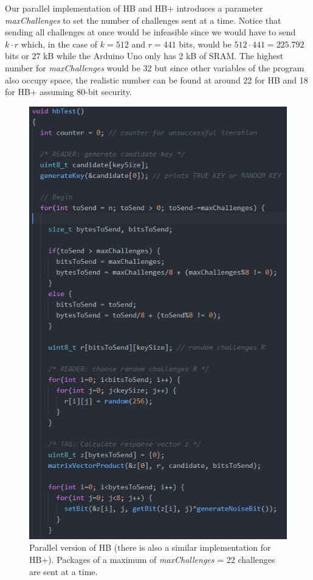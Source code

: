 \documentclass[11pt,a4paper]{article}
\begin{document}
Our parallel implementation of HB and HB+ introduces a parameter \textit{maxChallenges} to set the number of challenges sent at a time. 
Notice that sending all challenges at once would be infeasible since we would have to send $k \cdot r$ which, in the case of $ k = 512$ and $r = 441$ bits, would be $512 \cdot 441 = 225.792$ bits or $27$ kB while the Arduino Uno only has 2 kB of SRAM. 
The highest number for \textit{maxChallenges} would be 32 but since other variables of the program also occupy space, the realistic number can be found at around 22 for HB and 18 for HB+ assuming 80-bit security. 


\begin{figure}
	\includegraphics[width=12cm]{hb_parallel_code}
	\centering
	\caption{Parallel version of HB (there is also a similar implementation for HB+). Packages of a maximum of \textit{maxChallenges} = 22 challenges are sent at a time.}
	\label{hbp_code}
\end{figure}
\end{document}
